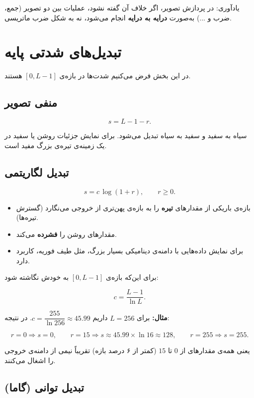 \documentclass[11pt,a4paper]{article}
\begin{document}
	یادآوری: در پردازش تصویر، اگر خلاف آن گفته نشود، عملیات بین دو تصویر
	(جمع، ضرب و ...) به‌صورت \textbf{درایه به درایه} انجام می‌شود، نه به شکل ضرب ماتریسی.
	
	
	\section{تبدیل‌های شدتی پایه}
	
	در این بخش فرض می‌کنیم شدت‌ها در بازه‌ی $[0,L-1]$ هستند.
	
	\subsection{منفی تصویر}
	
	\[
	s=L-1-r.
	\]
	
	سیاه به سفید و سفید به سیاه تبدیل می‌شود. برای نمایش جزئیات روشن یا سفید در یک زمینه‌ی تیره‌ی بزرگ مفید است.
	
	\subsection{تبدیل لگاریتمی}
	
	\[
	s=c\,\log(1+r),
	\qquad r\geq0.
	\]
	
	\begin{itemize}
		\item بازه‌ی باریکی از مقدارهای \textbf{تیره} را به بازه‌ی پهن‌تری از خروجی می‌نگارد (گسترش تیره‌ها).
		\item مقدارهای روشن را \textbf{فشرده} می‌کند.
		\item برای نمایش داده‌هایی با دامنه‌ی دینامیکی بسیار بزرگ، مثل طیف فوریه، کاربرد دارد.
	\end{itemize}
	
	برای این‌که بازه‌ی $[0,L-1]$ به خودش نگاشته شود:
	
	\[
	c=\frac{L-1}{\ln L}.
	\]
	
	\textbf{مثال:} برای $L=256$ داریم $c=\dfrac{255}{\ln256}\approx45.99$. در نتیجه:
	
	\[
	r=0\Rightarrow s=0,
	\qquad
	r=15\Rightarrow s\approx45.99\times\ln16\approx128,
	\qquad
	r=255\Rightarrow s=255.
	\]
	
	یعنی همه‌ی مقدارهای از $0$ تا $15$ (کمتر از ۶ درصد بازه) تقریباً نیمی از دامنه‌ی خروجی را اشغال می‌کنند.
	
	\subsection{تبدیل توانی (گاما)}
	
\end{document}
